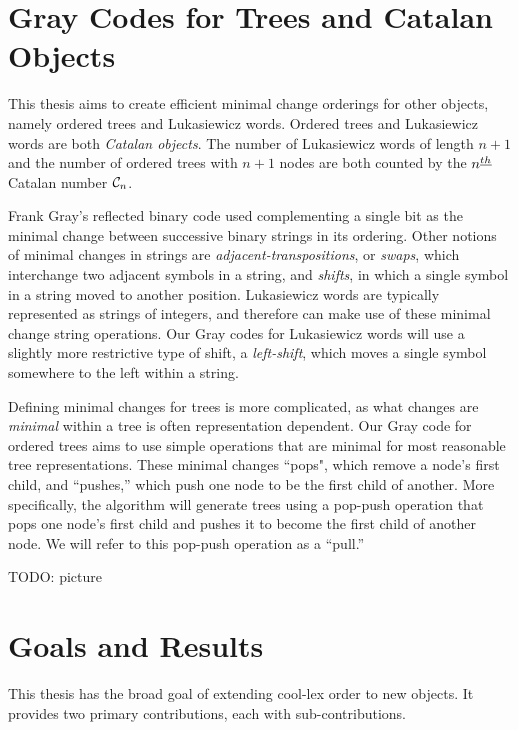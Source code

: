 \section{Gray Codes for Trees and Catalan Objects} \label{sec:intro_Graycodes}

This thesis aims to create efficient minimal change orderings for other objects, namely ordered trees and Lukasiewicz words.  Ordered trees and Lukasiewicz words are both \emph{Catalan objects}.  The number of Lukasiewicz words of length $n+1$ and the number of ordered trees with $n+1$ nodes are both counted by the $n^{\underline{th}}$ Catalan number $\mathcal{C}_n$.  

Frank Gray's reflected binary code used complementing a single bit as the minimal change between successive binary strings in its ordering.  Other notions of minimal changes in strings are \emph{adjacent-transpositions}, or \emph{swaps}, which interchange two adjacent symbols in a string, and \emph{shifts}, in which a single symbol in a string moved to another position. Lukasiewicz words are typically represented as strings of integers, and therefore can make use of these minimal change string operations.  Our Gray codes for Lukasiewicz words will use a slightly more restrictive type of shift, a \emph{left-shift}, which moves a single symbol somewhere to the left within a string. 




Defining minimal changes for trees is more complicated, as what changes are \emph{minimal} within a tree is often representation dependent.  Our Gray code for ordered trees aims to use simple operations that are minimal for most reasonable tree representations.  These minimal changes ``pops", which remove a node's first child, and ``pushes,'' which push one node to be the first child of another.  More specifically, the algorithm will generate trees using a pop-push operation that pops one node's first child and pushes it to become the first child of another node.  We will refer to this pop-push operation as a ``pull.''

TODO: picture



\section{Goals and Results}


This thesis has the broad goal of extending cool-lex order to new objects.  It provides two primary contributions, each with sub-contributions.  

